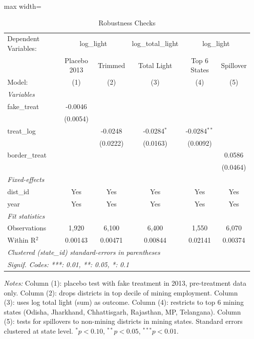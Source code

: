 \begin{table}[htbp]
   \caption{\label{tab:robust} Robustness Checks}
   \centering
   \begin{adjustbox}{max width=\textwidth}
\begin{tabular}{lccccc}
      \tabularnewline \midrule \midrule
      Dependent Variables: & \multicolumn{2}{c}{log\_light} & log\_total\_light & \multicolumn{2}{c}{log\_light}\\
                     & Placebo 2013 & Trimmed  & Total Light   & Top 6 States   & Spillover \\   
      Model:         & (1)          & (2)      & (3)           & (4)            & (5)\\  
      \midrule
      \emph{Variables}\\
      fake\_treat    & -0.0046      &          &               &                &   \\   
                     & (0.0054)     &          &               &                &   \\   
      treat\_log     &              & -0.0248  & -0.0284$^{*}$ & -0.0284$^{**}$ &   \\   
                     &              & (0.0222) & (0.0163)      & (0.0092)       &   \\   
      border\_treat  &              &          &               &                & 0.0586\\   
                     &              &          &               &                & (0.0464)\\   
      \midrule
      \emph{Fixed-effects}\\
      dist\_id       & Yes          & Yes      & Yes           & Yes            & Yes\\  
      year           & Yes          & Yes      & Yes           & Yes            & Yes\\  
      \midrule
      \emph{Fit statistics}\\
      Observations   & 1,920        & 6,100    & 6,400         & 1,550          & 6,070\\  
      Within R$^2$   & 0.00143      & 0.00471  & 0.00844       & 0.02141        & 0.00374\\  
      \midrule \midrule
      \multicolumn{6}{l}{\emph{Clustered (state\_id) standard-errors in parentheses}}\\
      \multicolumn{6}{l}{\emph{Signif. Codes: ***: 0.01, **: 0.05, *: 0.1}}\\
   \end{tabular}
\end{adjustbox}
   
   \par \raggedright 
   \textit{Notes:} Column (1): placebo test with fake treatment in 2013, pre-treatment data only. Column (2): drops districts in top decile of mining employment. Column (3): uses log total light (sum) as outcome. Column (4): restricts to top 6 mining states (Odisha, Jharkhand, Chhattisgarh, Rajasthan, MP, Telangana). Column (5): tests for spillovers to non-mining districts in mining states. Standard errors clustered at state level. $^{*}p<0.10$, $^{**}p<0.05$, $^{***}p<0.01$.
\end{table}
